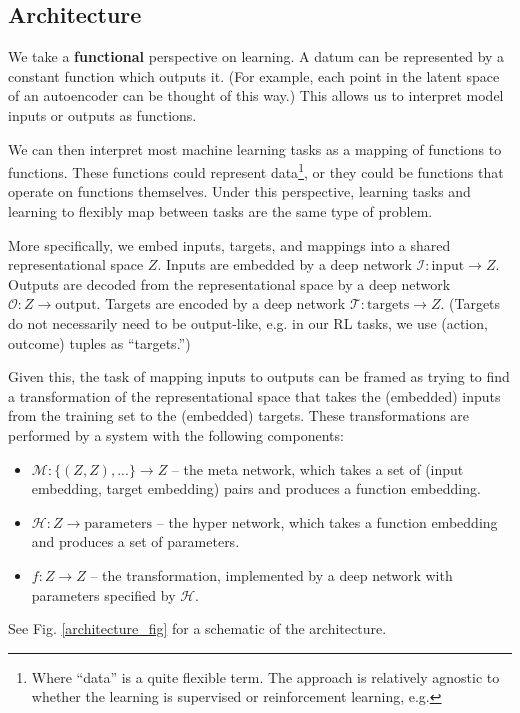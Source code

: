 \documentclass[11pt]{article}
\begin{document}
\subsection{Architecture}
We take a \textbf{functional} perspective on learning. A datum can be represented by a constant function which outputs it. (For example, each point in the latent space of an autoencoder can be thought of this way.) This allows us to interpret model inputs or outputs as functions. \par
We can then interpret most machine learning tasks as a mapping of functions to functions. These functions could represent data\footnote{Where ``data'' is a quite flexible term. The approach is relatively agnostic to whether the learning is supervised or reinforcement learning, e.g.}, or they could be functions that operate on functions themselves. Under this perspective, learning tasks and learning to flexibly map between tasks are the same type of problem. \par
More specifically, we embed inputs, targets, and mappings into a shared representational space $Z$. Inputs are embedded by a deep network $\mathcal{I}: \text{input} \rightarrow Z$. Outputs are decoded from the representational space by a deep network $\mathcal{O}: Z \rightarrow \text{output}$. Targets are encoded by a deep network $\mathcal{T}: \text{targets} \rightarrow Z$. (Targets do not necessarily need to be output-like, e.g. in our RL tasks, we use (action, outcome) tuples as ``targets.'') \par
Given this, the task of mapping inputs to outputs can be framed as trying to find a transformation of the representational space that takes the (embedded) inputs from the training set to the (embedded) targets. These transformations are performed by a system with the following components:  
\begin{itemize}
\item $\mathcal{M}: \{(Z, Z), ...\} \rightarrow Z $ -- the meta network, which takes a set of (input embedding, target embedding) pairs and produces a function embedding. 
\item $\mathcal{H}: Z \rightarrow \text{parameters}$ -- the hyper network, which takes a function embedding and produces a set of parameters. 
\item $f: Z \rightarrow Z$ -- the transformation, implemented by a deep network with parameters specified by $\mathcal{H}$.
\end{itemize}
See Fig. \ref{architecture_fig} for a schematic of the architecture. \par 
\end{document}
